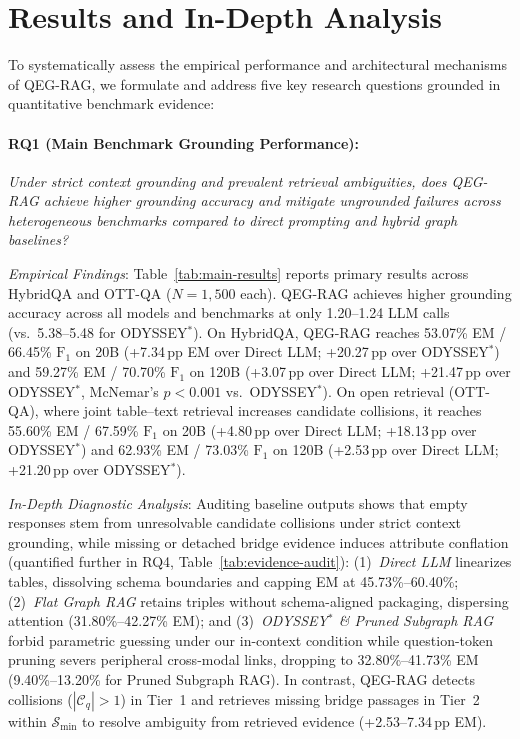 \documentclass[runningheads]{llncs}
\begin{document}
\section{Results and In-Depth Analysis}
\label{sec:results}
\enlargethispage{4.5\baselineskip}
To systematically assess the empirical performance and architectural mechanisms of QEG-RAG, we formulate and address five key research questions grounded in quantitative benchmark evidence:

\paragraph{RQ1 (Main Benchmark Grounding Performance):}
\emph{Under strict context grounding and prevalent retrieval ambiguities, does QEG-RAG achieve higher grounding accuracy and mitigate ungrounded failures across heterogeneous benchmarks compared to direct prompting and hybrid graph baselines?}

\emph{Empirical Findings}: Table~\ref{tab:main-results} reports primary results across HybridQA and OTT-QA ($N=1{,}500$ each). QEG-RAG achieves higher grounding accuracy across all models and benchmarks at only 1.20--1.24 LLM calls (vs.\ 5.38--5.48 for ODYSSEY$^*$). On HybridQA, QEG-RAG reaches 53.07\% EM / 66.45\% $\text{F}_1$ on 20B (+7.34\,pp EM over Direct LLM; +20.27\,pp over ODYSSEY$^*$) and 59.27\% EM / 70.70\% $\text{F}_1$ on 120B (+3.07\,pp over Direct LLM; +21.47\,pp over ODYSSEY$^*$, McNemar's $p < 0.001$ vs.\ ODYSSEY$^*$). On open retrieval (OTT-QA), where joint table--text retrieval increases candidate collisions, it reaches 55.60\% EM / 67.59\% $\text{F}_1$ on 20B (+4.80\,pp over Direct LLM; +18.13\,pp over ODYSSEY$^*$) and 62.93\% EM / 73.03\% $\text{F}_1$ on 120B (+2.53\,pp over Direct LLM; +21.20\,pp over ODYSSEY$^*$).

\emph{In-Depth Diagnostic Analysis}: Auditing baseline outputs shows that empty responses stem from unresolvable candidate collisions under strict context grounding, while missing or detached bridge evidence induces attribute conflation (quantified further in RQ4, Table~\ref{tab:evidence-audit}): (1)~\emph{Direct LLM} linearizes tables, dissolving schema boundaries and capping EM at 45.73\%--60.40\%; (2)~\emph{Flat Graph RAG} retains triples without schema-aligned packaging, dispersing attention (31.80\%--42.27\% EM); and (3)~\emph{ODYSSEY$^*$ \& Pruned Subgraph RAG} forbid parametric guessing under our in-context condition while question-token pruning severs peripheral cross-modal links, dropping to 32.80\%--41.73\% EM (9.40\%--13.20\% for Pruned Subgraph RAG). In contrast, QEG-RAG detects collisions ($|\mathcal{C}_q| > 1$) in Tier~1 and retrieves missing bridge passages in Tier~2 within $\mathcal{S}_{\min}$ to resolve ambiguity from retrieved evidence (+2.53--7.34\,pp EM).
\end{document}
